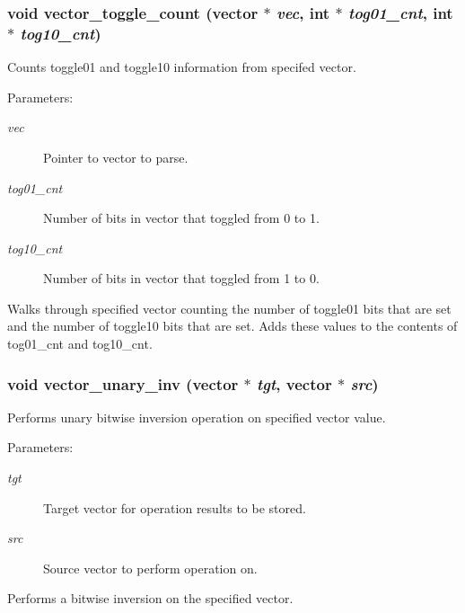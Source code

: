 \subsubsection{\setlength{\rightskip}{0pt plus 5cm}void vector\_\-toggle\_\-count ({\bf vector} $\ast$ {\em vec}, int $\ast$ {\em tog01\_\-cnt}, int $\ast$ {\em tog10\_\-cnt})}\label{vector_8c_a22}


Counts toggle01 and toggle10 information from specifed vector.

\begin{Desc}
\item[Parameters: ]\par
\begin{description}
\item[{\em 
vec}]Pointer to vector to parse. \item[{\em 
tog01\_\-cnt}]Number of bits in vector that toggled from 0 to 1. \item[{\em 
tog10\_\-cnt}]Number of bits in vector that toggled from 1 to 0.\end{description}
\end{Desc}
Walks through specified vector counting the number of toggle01 bits that are set and the number of toggle10 bits that are set. Adds these values to the contents of tog01\_\-cnt and tog10\_\-cnt. 
\subsubsection{\setlength{\rightskip}{0pt plus 5cm}void vector\_\-unary\_\-inv ({\bf vector} $\ast$ {\em tgt}, {\bf vector} $\ast$ {\em src})}\label{vector_8c_a38}


Performs unary bitwise inversion operation on specified vector value.

\begin{Desc}
\item[Parameters: ]\par
\begin{description}
\item[{\em 
tgt}]Target vector for operation results to be stored. \item[{\em 
src}]Source vector to perform operation on.\end{description}
\end{Desc}
Performs a bitwise inversion on the specified vector. 
